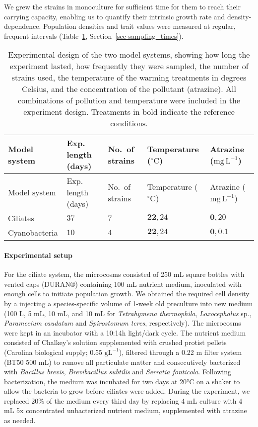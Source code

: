 \documentclass[
  letterpaper,
  DIV=11,
  numbers=noendperiod]{scrartcl}
\let\oldparagraph\paragraph
\renewcommand{\paragraph}[1]{\oldparagraph{#1}\mbox{}}
\begin{document}
We grew the strains in monoculture for sufficient time for them to reach
their carrying capacity, enabling us to quantify their intrinsic growth
rate and density-dependence. Population densities and trait values were
measured at regular, frequent intervals
(Table~\ref{tbl-treatment_table}, Section~\ref{sec-sampling_times}).

\label{tbl-treatment_table}
\begin{longtable}[]{@{}lllll@{}}
\caption{\label{tbl-treatment_table}Experimental design of the two model
systems, showing how long the experiment lasted, how frequently they
were sampled, the number of strains used, the temperature of the warming
treatments in degrees Celsius, and the concentration of the pollutant
(atrazine). All combinations of pollution and temperature were included
in the experiment design. Treatments in bold indicate the reference
conditions.}\tabularnewline
\toprule\noalign{}
Model system & Exp. length (days) & No.~of strains & Temperature
(\(\mathrm{^\circ C}\)) & Atrazine (\(\mathrm{mg\,L}^{-1}\)) \\
\midrule\noalign{}
\endfirsthead
\toprule\noalign{}
Model system & Exp. length (days) & No.~of strains & Temperature
(\(\mathrm{^\circ C}\)) & Atrazine (\(\mathrm{mg\,L}^{-1}\)) \\
\midrule\noalign{}
\endhead
\bottomrule\noalign{}
\endlastfoot
Ciliates & \(37\) & \(7\) & \(\mathbf{22}, 24\) & \(\mathbf{0}, 20\) \\
Cyanobacteria & \(10\) & \(4\) & \(\mathbf{22}, 24\) &
\(\mathbf{0}, 0.1\) \\
\end{longtable}

\paragraph{Experimental setup}\label{experimental-setup}

For the ciliate system, the microcosms consisted of 250 mL square
bottles with vented caps (DURAN®) containing 100 mL nutrient medium,
inoculated with enough cells to initiate population growth. We obtained
the required cell density by a injecting a species-specific volume of
1-week old preculture into new medium (100 \textmu L, 5 mL, 10 mL, and
10 mL for \emph{Tetrahymena thermophila}, \emph{Loxocephalus} sp.,
\emph{Paramecium caudatum} and \emph{Spirostomum teres}, respectively).
The microcosms were kept in an incubator with a 10:14h light/dark cycle.
The nutrient medium consisted of Chalkey's solution supplemented with
crushed protist pellets (Carolina biological supply; 0.55
\(\mathrm{gL}^{-1}\)), filtered through a 0.22 \textmu m filter system
(BT50 500 mL) to remove all particulate matter and consecutively
bacterized with \emph{Bacillus brevis}, \emph{Brevibacillus subtilis}
and \emph{Serratia fonticola}. Following bacterization, the medium was
incubated for two days at 20°C on a shaker to allow the bacteria to grow
before ciliates were added. During the experiment, we replaced 20\% of
the medium every third day by replacing 4 mL culture with 4 mL 5x
concentrated unbacterized nutrient medium, supplemented with atrazine as
needed.
\end{document}
